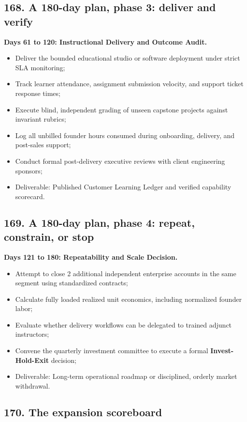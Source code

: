 \subsection{168. A 180-day plan, phase 3: deliver and verify}

\textbf{Days 61 to 120: Instructional Delivery and Outcome Audit.}
\begin{itemize}
    \item Deliver the bounded educational studio or software deployment under strict SLA monitoring;
    \item Track learner attendance, assignment submission velocity, and support ticket response times;
    \item Execute blind, independent grading of unseen capstone projects against invariant rubrics;
    \item Log all unbilled founder hours consumed during onboarding, delivery, and post-sales support;
    \item Conduct formal post-delivery executive reviews with client engineering sponsors;
    \item Deliverable: Published Customer Learning Ledger and verified capability scorecard.
\end{itemize}

\subsection{169. A 180-day plan, phase 4: repeat, constrain, or stop}

\textbf{Days 121 to 180: Repeatability and Scale Decision.}
\begin{itemize}
    \item Attempt to close 2 additional independent enterprise accounts in the same segment using standardized contracts;
    \item Calculate fully loaded realized unit economics, including normalized founder labor;
    \item Evaluate whether delivery workflows can be delegated to trained adjunct instructors;
    \item Convene the quarterly investment committee to execute a formal \textbf{Invest-Hold-Exit} decision;
    \item Deliverable: Long-term operational roadmap or disciplined, orderly market withdrawal.
\end{itemize}

\subsection{170. The expansion scoreboard}

